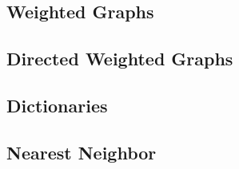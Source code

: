 \subsection{Weighted Graphs}


\subsection{Directed Weighted Graphs}

\newpage

\subsection{Dictionaries}

\newpage

\subsection{Nearest Neighbor}
